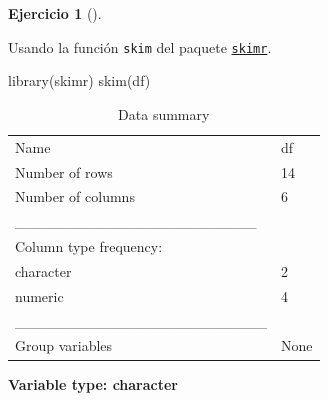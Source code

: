 \documentclass[
  a4paper,
]{scrreport}
\newenvironment{Shaded}{\begin{snugshade}}{\end{snugshade}}
\newcommand{\FunctionTok}[1]{\textcolor[rgb]{0.28,0.35,0.67}{#1}}
\newcommand{\NormalTok}[1]{\textcolor[rgb]{0.00,0.23,0.31}{#1}}
\theoremstyle{definition}
\newtheorem{exercise}{Ejercicio}[chapter]
\theoremstyle{remark}
\begin{document}
\begin{exercise}[]
\begin{enumerate}
  \begin{tcolorbox}[enhanced jigsaw, breakable, toptitle=1mm, colbacktitle=quarto-callout-tip-color!10!white, rightrule=.15mm, opacityback=0, opacitybacktitle=0.6, titlerule=0mm, coltitle=black, colframe=quarto-callout-tip-color-frame, colback=white, bottomtitle=1mm, leftrule=.75mm, toprule=.15mm, title=\textcolor{quarto-callout-tip-color}{\faLightbulb}\hspace{0.5em}{Solución 3}, arc=.35mm, bottomrule=.15mm, left=2mm]

  Usando la función \texttt{skim} del paquete
  \href{https://cran.r-project.org/web/packages/skimr/vignettes/skimr.html}{\texttt{skimr}}.

\begin{Shaded}
\begin{Highlighting}[]
\FunctionTok{library}\NormalTok{(skimr)}
\FunctionTok{skim}\NormalTok{(df)}
\end{Highlighting}
\end{Shaded}

  \begin{longtable}[]{@{}ll@{}}
  \caption{Data summary}\tabularnewline
  \toprule\noalign{}
  \endfirsthead
  \endhead
  \bottomrule\noalign{}
  \endlastfoot
  Name & df \\
  Number of rows & 14 \\
  Number of columns & 6 \\
  \_\_\_\_\_\_\_\_\_\_\_\_\_\_\_\_\_\_\_\_\_\_\_ & \\
  Column type frequency: & \\
  character & 2 \\
  numeric & 4 \\
  \_\_\_\_\_\_\_\_\_\_\_\_\_\_\_\_\_\_\_\_\_\_\_\_ & \\
  Group variables & None \\
  \end{longtable}

  \textbf{Variable type: character}


\end{tcolorbox}
\end{enumerate}
\end{exercise}
\end{document}

